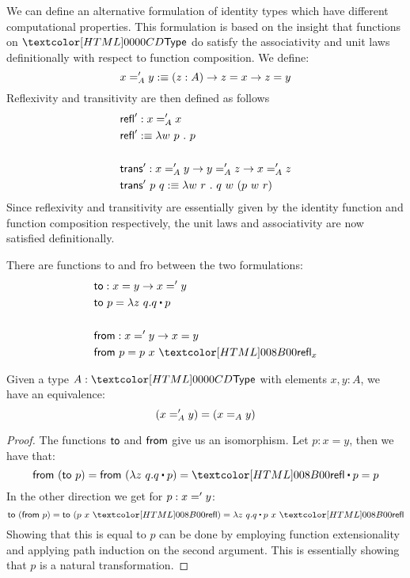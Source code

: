 We can define an alternative formulation of identity types which have
different computational properties. This formulation is based on the
insight that functions on $\Type$ do satisfy the associativity and
unit laws definitionally with respect to function composition. We define:
$$
x ='_{A} y :\equiv (z : A) \to z = x \to z = y
$$
Reflexivity and transitivity are then defined as follows
%
\begin{align*}
&\ident{refl}' : x \alteq_{A} x \\
&\ident{refl}' \ddefeq \lambda w\ p\ .\ p \\
\\
&\ident{trans}' : x \alteq_{A} y \to y \alteq_{A} z \to x \alteq_{A} z \\
&\ident{trans}'\ p\ q \ddefeq \lambda w\ r\ .\ q\ w\ (p\ w\ r)
\end{align*}
%
Since reflexivity and transitivity are essentially given by the
identity function and function composition respectively, the unit laws
and associativity are now satisfied definitionally.

There are functions to and fro between the two formulations:
\begin{align*}
  &\ident{to} : x = y \to x \alteq y \\
  &\ident{to}\ p = \lambda z\ q . \trans{q}{p} \\
  \\
  &\ident{from} : x \alteq y \to x = y \\
  &\ident{from}\ p = p\ x\ \refl_{x}
\end{align*}

\begin{proposition}
  Given a type $A : \Type$ with elements $x, y : A$, we have an equivalence:
  $$
  (x ='_{A} y) = (x =_{A} y)
  $$
\end{proposition}

\begin{proof}
  The functions $\ident{to}$ and $\ident{from}$ give us an isomorphism. Let $p : x = y$, then we have that:
  $$
  \ident{from}\ (\ident{to}\ p) = \ident{from}\ (\lambda z\ q . \trans{q}{p}) = \trans{\refl}{p} = p
  $$
  In the other direction we get for $p : x =' y$:
  $$
  \ident{to}\ (\ident{from}\ p) = \ident{to}\ (p\ x\ \refl) = \lambda z\ q . \trans{q}{p\ x\ \refl}
  $$
  Showing that this is equal to $p$ can be done by employing function
  extensionality and applying path induction on the second
  argument. This is essentially showing that $p$ is a natural
  transformation.
\end{proof}

